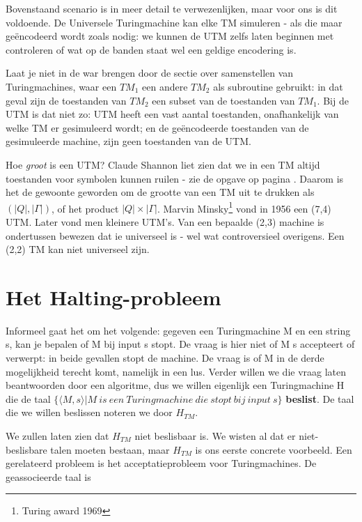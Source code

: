 Bovenstaand scenario is in meer detail te verwezenlijken, maar voor ons
is dit voldoende. De Universele Turingmachine kan elke TM simuleren -
als die maar ge\"{e}ncodeerd wordt zoals nodig: we kunnen de UTM zelfs
laten beginnen met controleren of wat op de banden staat wel een
geldige encodering is.  

Laat je niet in de war brengen door de sectie over samenstellen van
Turingmachines, waar een $TM_1$ een andere $TM_2$ als subroutine
gebruikt: in dat geval zijn de toestanden van $TM_2$ een subset
van de toestanden van $TM_1$. Bij de UTM is dat niet zo: UTM heeft een
vast aantal toestanden, onafhankelijk van welke TM er gesimuleerd
wordt; en de ge\"{e}ncodeerde toestanden van de gesimuleerde machine, zijn
geen toestanden van de UTM.


Hoe {\em groot} is een UTM? Claude Shannon liet zien dat we in een TM
altijd toestanden voor symbolen kunnen ruilen - zie de opgave op
pagina \pageref{twosymbols}. Daarom is het de gewoonte geworden om de
grootte van een TM uit te drukken als $(|Q|,|\Gamma|)$, of het product
$|Q| \times |\Gamma|$. Marvin Minsky\footnote{Turing award 1969} vond in 1956 een (7,4) UTM. Later
vond men kleinere UTM's. Van een bepaalde (2,3) machine is ondertussen
bewezen dat ie universeel is - wel wat controversieel overigens. Een
(2,2) TM kan niet universeel zijn.



\section{Het Halting-probleem}\label{halting}

Informeel gaat het om het volgende: gegeven een Turingmachine M en een
string s, kan je bepalen of M bij input s stopt. De vraag is hier niet
of M s accepteert of verwerpt: in beide gevallen stopt de machine. De
vraag is of M in de derde mogelijkheid terecht komt, namelijk in een
lus. Verder willen we die vraag laten beantwoorden door een algoritme,
dus we willen eigenlijk een Turingmachine H die de taal
%
$\{\langle M,s \rangle| M~is~een~Turingmachine~die~stopt~bij~input~s\}$ {\bf
beslist}. De taal die we willen beslissen noteren we door $H_{TM}$.


We zullen laten zien dat $H_{TM}$ niet beslisbaar is. We wisten al dat
er niet-beslisbare talen moeten bestaan, maar $H_{TM}$ is ons eerste
concrete voorbeeld. 
Een gerelateerd probleem is het acceptatieprobleem voor
Turingmachines. De geassocieerde taal is

